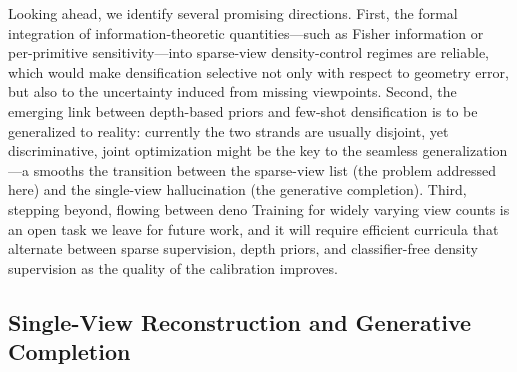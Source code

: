 \documentclass[11pt,a4paper]{article}
\begin{document}
Looking ahead, we identify several promising directions. First, the formal integration of information-theoretic quantities---such as Fisher information or per-primitive sensitivity---into sparse-view density-control regimes are reliable, which would make densification selective not only with respect to geometry error, but also to the uncertainty induced from missing viewpoints. Second, the emerging link between depth-based priors and few-shot densification is to be generalized to reality: currently the two strands are usually disjoint, yet discriminative, joint optimization might be the key to the seamless generalization---a smooths the transition between the sparse-view list (the problem addressed here) and the single-view hallucination (the generative completion). Third, stepping beyond, flowing between deno Training for widely varying view counts is an open task we leave for future work, and it will require efficient curricula that alternate between sparse supervision, depth priors, and classifier-free density supervision as the quality of the calibration improves.


\subsection{Single-View Reconstruction and Generative Completion}
\end{document}
